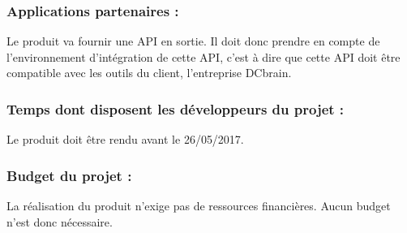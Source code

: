 			\subsubsection{Applications partenaires :}
				Le produit va fournir une API en sortie. Il doit donc prendre en compte de l'environnement d'intégration de cette API, c'est à dire que cette API doit être compatible avec les outils du client, l'entreprise DCbrain.
				
			\subsubsection{Temps dont disposent les développeurs du projet :}
				Le produit doit être rendu avant le 26/05/2017.
				
			\subsubsection{Budget du projet :}
				La réalisation du produit n'exige pas de ressources financières. Aucun budget n'est donc nécessaire.
		
